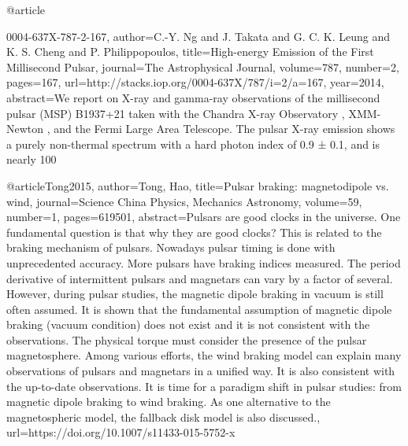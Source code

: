@article{0004-637X-787-2-167,
  author={C.-Y. Ng and J. Takata and G. C. K. Leung and K. S. Cheng and P. Philippopoulos},
  title={High-energy Emission of the First Millisecond Pulsar},
  journal={The Astrophysical Journal},
  volume={787},
  number={2},
  pages={167},
  url={http://stacks.iop.org/0004-637X/787/i=2/a=167},
  year={2014},
  abstract={We report on X-ray and gamma-ray observations of the millisecond pulsar (MSP) B1937+21 taken with the Chandra X-ray Observatory , XMM-Newton , and the Fermi Large Area Telescope. The pulsar X-ray emission shows a purely non-thermal spectrum with a hard photon index of 0.9 ± 0.1, and is nearly 100%
}


@article{Tong2015,
  author={Tong, Hao},
  title={Pulsar braking: magnetodipole vs. wind},
  journal={Science China Physics, Mechanics Astronomy},
  volume={59},
  number={1},
  pages={619501},
  abstract={Pulsars are good clocks in the universe. One fundamental question is that why they are good clocks? This is related to the braking mechanism of pulsars. Nowadays pulsar timing is done with unprecedented accuracy. More pulsars have braking indices measured. The period derivative of intermittent pulsars and magnetars can vary by a factor of several. However, during pulsar studies, the magnetic dipole braking in vacuum is still often assumed. It is shown that the fundamental assumption of magnetic dipole braking (vacuum condition) does not exist and it is not consistent with the observations. The physical torque must consider the presence of the pulsar magnetosphere. Among various efforts, the wind braking model can explain many observations of pulsars and magnetars in a unified way. It is also consistent with the up-to-date observations. It is time for a paradigm shift in pulsar studies: from magnetic dipole braking to wind braking. As one alternative to the magnetospheric model, the fallback disk model is also discussed.},
  url={https://doi.org/10.1007/s11433-015-5752-x}
}

}
